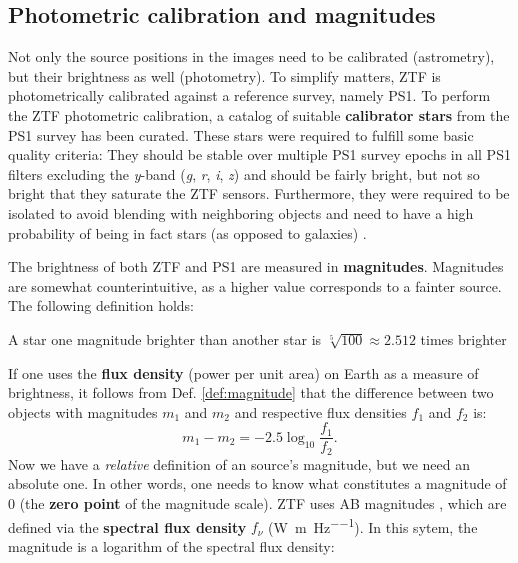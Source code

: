 \subsection{Photometric calibration and magnitudes} \label{magnitudes}
Not only the source positions in the images need to be calibrated (astrometry), but their brightness as well (photometry). To simplify matters, ZTF is photometrically calibrated against a reference survey, namely PS1. To perform the ZTF photometric calibration, a catalog of suitable \textbf{calibrator stars} from the PS1 survey has been curated. These stars were required to fulfill some basic quality criteria: They should be stable over multiple PS1 survey epochs in all PS1 filters excluding the \textit{y}-band (\textit{g}, \textit{r}, \textit{i}, \textit{z}) and should be fairly bright, but not so bright that they saturate the ZTF sensors. Furthermore, they were required to be isolated to avoid blending with neighboring objects and need to have a high probability of being in fact stars (as opposed to galaxies) \cite{Masci2019a}.

The brightness of both ZTF and PS1 are measured in \textbf{magnitudes}. Magnitudes are somewhat counterintuitive, as a higher value corresponds to a fainter source. The following definition holds:

\begin{definition}
A star one magnitude brighter than another star is $\sqrt[5]{100} \approx 2.512$ times brighter
\end{definition}
If one uses the \textbf{flux density} (power per unit area) on Earth as a measure of brightness, it follows from Def. \ref{def:magnitude} that the difference between two objects with magnitudes $m_1$ and $m_2$ and respective flux densities $f_1$ and $f_2$ is:
\begin{equation}
m_1 - m_2 = -2.5 \log_{10}{\frac{f_1}{f_2}}.
\end{equation}
Now we have a \textit{relative} definition of an source's magnitude, but we need an absolute one. In other words, one needs to know what constitutes a magnitude of 0 (the \textbf{zero point} of the magnitude scale). ZTF uses AB magnitudes , which are defined via the \textbf{spectral flux density} $f_\nu$ (\unit{\W\per\m\per\Hz}). In this sytem, the magnitude is a logarithm of the spectral flux density: 

